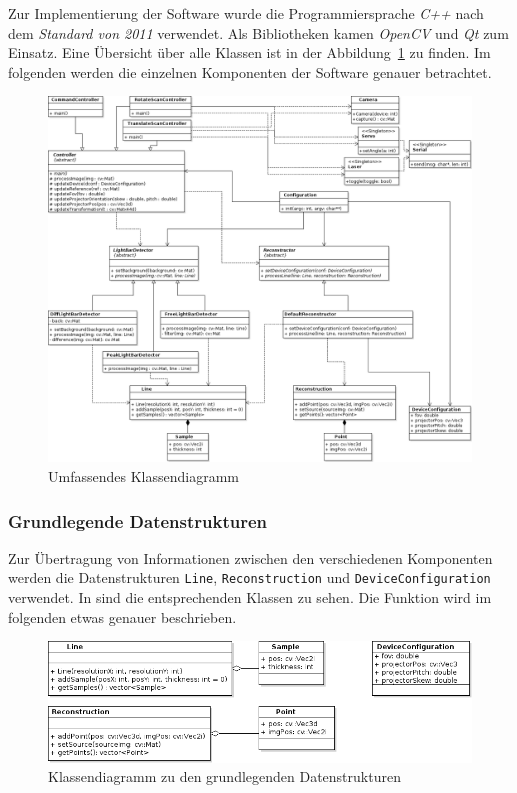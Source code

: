 \documentclass[ngerman,a4paper,parskip=half]{scrartcl}
\begin{document}
Zur Implementierung der Software wurde die Programmiersprache \emph{C++} nach dem \emph{Standard von 2011} verwendet. Als Bibliotheken kamen \emph{OpenCV} und \emph{Qt} zum Einsatz. Eine Übersicht über alle Klassen ist in der Abbildung~\ref{fig:classes_all} zu finden. Im folgenden werden die einzelnen Komponenten der Software genauer betrachtet.

\begin{figure}[p]
	\centering
	\includegraphics[width=\linewidth]{includes/classdiagram}
	\caption{Umfassendes Klassendiagramm}
	\label{fig:classes_all}
\end{figure}

\subsubsection{Grundlegende Datenstrukturen}

Zur Übertragung von Informationen zwischen den verschiedenen Komponenten werden die Datenstrukturen \texttt{Line}, \texttt{Reconstruction} und \texttt{DeviceConfiguration} verwendet. In  sind die entsprechenden Klassen zu sehen. Die Funktion wird im folgenden etwas genauer beschrieben.

\begin{figure}
	\centering
	\includegraphics[width=\linewidth]{includes/classdiagram_base.png}
	\caption{Klassendiagramm zu den grundlegenden Datenstrukturen}
	\label{fig:classes_base}
\end{figure}
\end{document}
